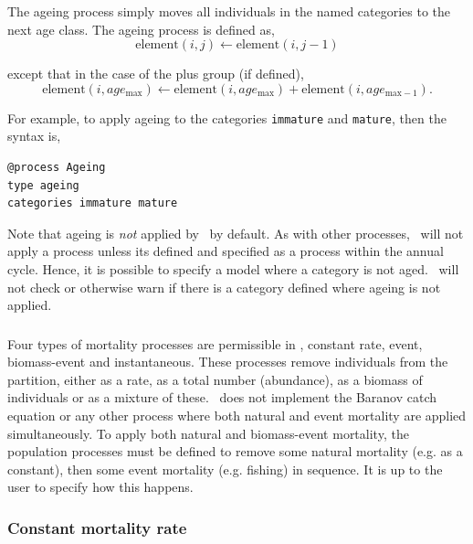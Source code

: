 \subsubsection{\label{sec:ageing}}
\CH
The ageing process simply moves all individuals in the named categories to the next age class. The ageing process is defined as,
\begin{equation}
  \text{element}(i,j) \leftarrow \text{element}(i,j-1)
\end{equation}

except that in the case of the plus group (if defined), 
\begin{equation}
  \text{element}(i,age_{\text{max}}) \leftarrow \text{element}(i,age_{\text{max}}) + \text{element}(i,age_{\text{max}-1}).
\end{equation}

For example, to apply ageing to the categories \texttt{immature} and \texttt{mature}, then the syntax is,

{\small{\begin{verbatim}
@process Ageing
type ageing
categories immature mature
\end{verbatim}}}

Note that ageing is \emph{not} applied by \CAS\ by default. As with other processes, \CAS\ will not apply a process unless its defined and specified as a process within the annual cycle. Hence, it is possible to specify a model where a category is not aged. \CAS\ will not check or otherwise warn if there is a category defined where ageing is not applied.

\subsubsection{\label{sec:mortality}}
\CH
Four types of mortality processes are permissible in \CAS, constant rate, event, biomass-event and instantaneous. These processes remove individuals from the partition, either as a rate, as a total number (abundance), as a biomass of individuals or as a mixture of these. \CAS\ does not implement the Baranov catch equation or any other process where both natural and event mortality are applied simultaneously. To apply both natural and biomass-event mortality, the population processes must be defined to remove some natural mortality (e.g. as a constant), then some event mortality (e.g. fishing) in sequence. It is up to the user to specify how this happens.

\subsubsection*{Constant mortality rate}

